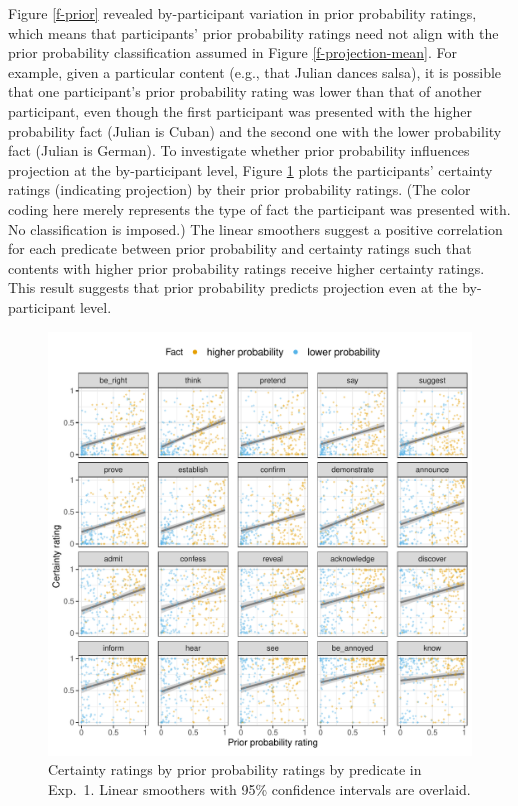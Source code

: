 \documentclass[11pt,fleqn]{article}
\newcommand{\6}{\mbox{$[\hspace*{-.6mm}[$}}
\newcommand{\9}{\mbox{$]\hspace*{-.6mm}]$}}
\begin{document}
Figure \ref{f-prior} revealed by-participant variation in prior probability ratings, which means that participants' prior probability ratings need not align with the prior probability classification assumed in Figure \ref{f-projection-mean}. For example, given a particular content (e.g., that Julian dances salsa), it is possible that one participant's prior probability rating was lower than that of another participant, even though the first participant was presented with the higher probability fact (Julian is Cuban) and the second one with the lower probability fact (Julian is German). To investigate whether prior probability influences projection at the by-participant level, Figure \ref{f-projection} plots the participants' certainty ratings (indicating projection) by their prior probability ratings. (The color coding here merely represents the type of fact the participant was presented with. No classification is imposed.) The linear smoothers suggest a positive correlation for each predicate between prior probability and certainty ratings such that contents with higher prior probability ratings receive higher certainty ratings. This result suggests that prior probability predicts projection even at the by-participant level.

\begin{figure}[h!]
\centering

\includegraphics[width=.7\paperwidth]{../../results/exp4/graphs/projection-by-prior}

\caption{Certainty ratings by prior probability ratings by predicate in Exp.~1. Linear smoothers with 95\% confidence intervals are overlaid.}
\label{f-projection}
\end{figure}
\end{document}
